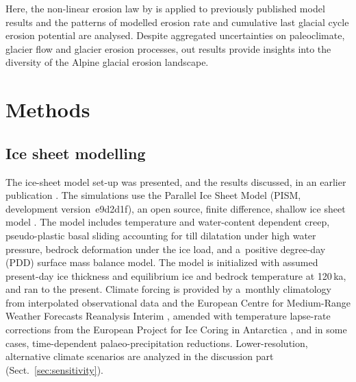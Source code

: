 \documentclass[utf8]{article}
\begin{document}
    Here, the non-linear erosion law by \citet{Koppes.etal.2015} is applied to
    previously published model results \citep{Seguinot.etal.2018} and the
    patterns of modelled erosion rate and cumulative last glacial cycle erosion
    potential are analysed. Despite aggregated uncertainties on paleoclimate,
    glacier flow and glacier erosion processes, out results provide insights
    into the diversity of the Alpine glacial erosion landscape.


\section{Methods}

\subsection{Ice sheet modelling}

    The ice-sheet model set-up was presented, and the results discussed, in an
    earlier publication \citep{Seguinot.etal.2018}. The simulations use the
    Parallel Ice Sheet Model (PISM, development version~e9d2d1f), an open
    source, finite difference, shallow ice sheet model
    \citep{PISM-authors.2017}. The model includes temperature and water-content
    dependent creep, pseudo-plastic basal sliding accounting for till
    dilatation under high water pressure, bedrock deformation under the ice
    load, and a~positive degree-day (PDD) surface mass balance model. The model
    is initialized with assumed present-day ice thickness and equilibrium
    ice and bedrock temperature at 120\,ka, and ran to the present.
    Climate forcing is provided by a~monthly climatology from interpolated
    observational data \citep[WorldClim;][]{Hijmans.etal.2005} and the European
    Centre for Medium-Range Weather Forecasts Reanalysis Interim
    \citep[ERA-Interim;][]{Dee.etal.2011}, amended with temperature lapse-rate
    corrections from the European Project for Ice Coring in Antarctica
    \citep[EPICA;][] {Jouzel.etal.2007}, and in some cases, time-dependent
    palaeo-precipitation reductions. Lower-resolution, alternative climate
    scenarios are analyzed in the discussion part
    (Sect.~\ref{sec:sensitivity}).
\end{document}
